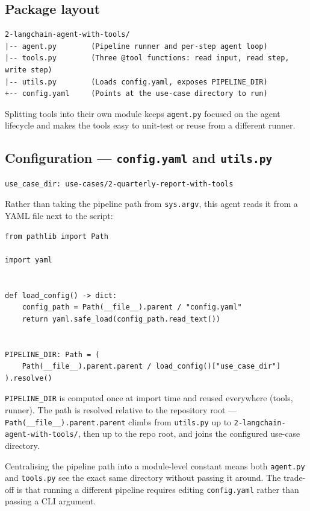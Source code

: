 \documentclass[12pt, a4paper]{article}
\begin{document}
\subsection{Package layout}

\begin{lstlisting}
2-langchain-agent-with-tools/
|-- agent.py        (Pipeline runner and per-step agent loop)
|-- tools.py        (Three @tool functions: read input, read step, write step)
|-- utils.py        (Loads config.yaml, exposes PIPELINE_DIR)
+-- config.yaml     (Points at the use-case directory to run)
\end{lstlisting}

Splitting tools into their own module keeps \texttt{agent.py} focused on the agent lifecycle and makes the tools easy to unit-test or reuse from a different runner.

\subsection{Configuration — \texttt{config.yaml} and \texttt{utils.py}}

\begin{lstlisting}[language={}]
use_case_dir: use-cases/2-quarterly-report-with-tools
\end{lstlisting}

Rather than taking the pipeline path from \texttt{sys.argv}, this agent reads it from a YAML file next to the script:

\begin{lstlisting}[style=pythonstyle]
from pathlib import Path

import yaml


def load_config() -> dict:
    config_path = Path(__file__).parent / "config.yaml"
    return yaml.safe_load(config_path.read_text())


PIPELINE_DIR: Path = (
    Path(__file__).parent.parent / load_config()["use_case_dir"]
).resolve()
\end{lstlisting}

\texttt{PIPELINE\_DIR} is computed once at import time and reused everywhere (tools, runner). The path is resolved relative to the repository root — \texttt{Path(\_\_file\_\_).parent.parent} climbs from \texttt{utils.py} up to \texttt{2-langchain-agent-with-tools/}, then up to the repo root, and joins the configured use-case directory.

\begin{notebox}
Centralising the pipeline path into a module-level constant means both \texttt{agent.py} and \texttt{tools.py} see the exact same directory without passing it around. The trade-off is that running a different pipeline requires editing \texttt{config.yaml} rather than passing a CLI argument.
\end{notebox}
\end{document}
